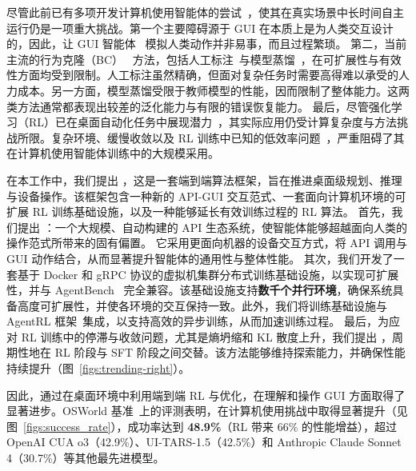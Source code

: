 尽管此前已有多项开发计算机使用智能体的尝试~\citep{agashe2025agent, lei2024infant, xie2025scaling}，使其在真实场景中长时间自主运行仍是一项重大挑战。第一个主要障碍源于 GUI 在本质上是为人类交互设计的，因此，让 GUI 智能体~\citep{liu2024autoglm,cua2025,qin2025ui} 模拟人类动作并非易事，而且过程繁琐。
第二，当前主流的行为克隆（BC）~\citep{bain1995framework, bratko1995behavioural} 方法，包括人工标注~\citep{he2025efficient}与模型蒸馏~\citep{sun2024genesis,xu2024aguvis}，在可扩展性与有效性方面均受到限制。人工标注虽然精确，但面对复杂任务时需要高得难以承受的人力成本。另一方面，模型蒸馏受限于教师模型的性能，因而限制了整体能力。这两类方法通常都表现出较差的泛化能力与有限的错误恢复能力。
最后，尽管强化学习（RL）已在桌面自动化任务中展现潜力~\citep{lu2025arpo, feng2025group}，其实际应用仍受计算复杂度与方法挑战所限。复杂环境、缓慢收敛以及 RL 训练中已知的低效率问题~\citep{xie2024osworld, bonatti2024windows, yu2025dapo, fu2025areal}，严重阻碍了其在计算机使用智能体训练中的大规模采用。

在本工作中，我们提出 \computerrl，这是一套端到端算法框架，旨在推进桌面级规划、推理与设备操作。该框架包含一种新的 API-GUI 交互范式、一套面向计算机环境的可扩展 RL 训练基础设施，以及一种能够延长有效训练过程的 RL 算法。
首先，我们提出 \actionmethod：一个大规模、自动构建的 API 生态系统，使智能体能够超越面向人类的操作范式所带来的固有偏置。
它采用更面向机器的设备交互方式，将 API 调用与 GUI 动作结合，从而显著提升智能体的通用性与整体性能。
其次，我们开发了一套基于 Docker 和 gRPC 协议的虚拟机集群分布式训练基础设施，以实现可扩展性，并与 AgentBench~\citep{liu2023agentbench} 完全兼容。该基础设施支持\textbf{数千个并行环境}，确保系统具备高度可扩展性，并使各环境的交互保持一致。此外，我们将训练基础设施与 AgentRL 框架~\citep{zhang2025model}集成，以支持高效的异步训练，从而加速训练过程。
最后，为应对 RL 训练中的停滞与收敛问题，尤其是熵坍缩和 KL 散度上升，我们提出 \rlmethod，周期性地在 RL 阶段与 SFT 阶段之间交替。该方法能够维持探索能力，并确保性能持续提升（图~\ref{figs:trending-right}）。

因此，通过在桌面环境中利用端到端 RL 与优化，\computerrl 在理解和操作 GUI 方面取得了显著进步。OSWorld 基准~\citep{xie2024osworld}上的评测表明，\computerrl 在计算机使用挑战中取得显著提升（见图~\ref{figs:success_rate}），成功率达到 \textbf{48.9\%}（RL 带来 66\% 的性能增益），超过 OpenAI CUA o3（42.9\%）、UI-TARS-1.5（42.5\%）和 Anthropic Claude Sonnet 4（30.7\%）等其他最先进模型。

